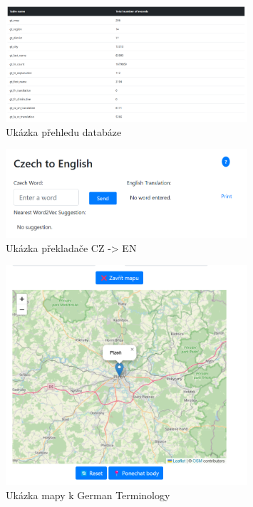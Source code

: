\documentclass[czech, ba, kiv, he]{fasthesis}
\begin{document}
\begin{figure}[h]  
    \centering  
    \includegraphics[width=0.8\textwidth]{database_status.png}  
    \caption{Ukázka přehledu databáze}  
\end{figure}

\begin{figure}[h]  
    \centering  
    \includegraphics[width=0.8\textwidth]{cz_en_translation.png}  
    \caption{Ukázka překladače CZ -> EN}  
\end{figure}

\begin{figure}[h]  
    \centering  
    \includegraphics[width=0.8\textwidth]{German_Terminology.png}  
    \caption{Ukázka mapy k German Terminology}  
\end{figure}
\end{document}
